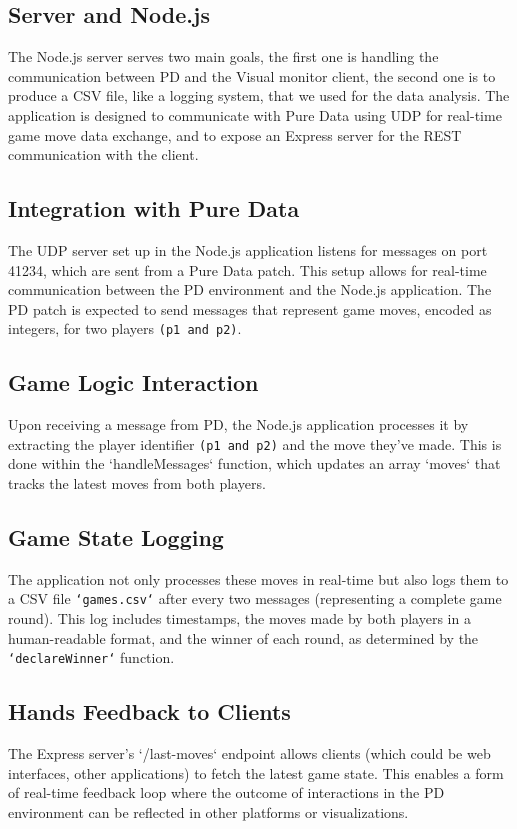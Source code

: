 \documentclass[11pt,a4paper]{report}
\begin{document}
\subsection*{Server and Node.js}
The Node.js server serves two main goals, the first one is handling the communication between PD and the Visual monitor client, the second one is to produce a CSV file, like a logging system, that we used for the data analysis. 
The application is designed to communicate with Pure Data using UDP for real-time game move data exchange, and to expose an Express server for the REST communication with the client.

\subsection*{Integration with Pure Data}
The UDP server set up in the Node.js application listens for messages on port 41234, which are sent from a Pure Data patch. This setup allows for real-time communication between the PD environment and the Node.js application. The PD patch is expected to send messages that represent game moves, encoded as integers, for two players \texttt{(p1 and p2)}.

\subsection*{Game Logic Interaction}
Upon receiving a message from PD, the Node.js application processes it by extracting the player identifier \texttt{(p1 and p2)} and the move they've made. This is done within the `handleMessages` function, which updates an array `moves` that tracks the latest moves from both players.

\subsection*{Game State Logging}
The application not only processes these moves in real-time but also logs them to a CSV file \texttt{`games.csv`} after every two messages (representing a complete game round). This log includes timestamps, the moves made by both players in a human-readable format, and the winner of each round, as determined by the \texttt{`declareWinner`} function.

\subsection*{Hands Feedback to Clients}
The Express server's `/last-moves` endpoint allows clients (which could be web interfaces, other applications) to fetch the latest game state. This enables a form of real-time feedback loop where the outcome of interactions in the PD environment can be reflected in other platforms or visualizations.
\end{document}
